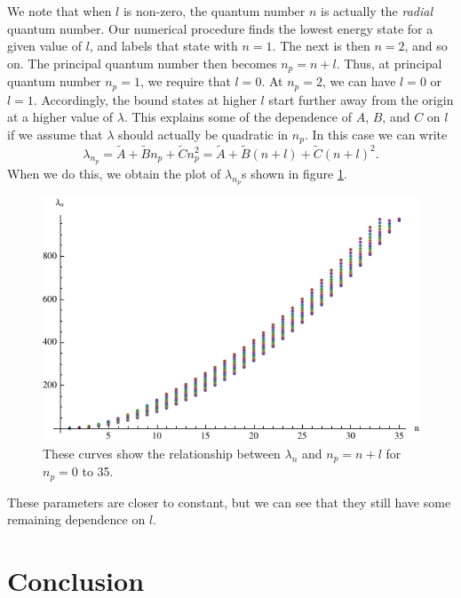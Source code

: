 \documentclass[12pt,twoside]{reedthesis}
\newcommand{\eqn}[1]{\begin{equation}#1\end{equation}}
\begin{document}
We note that when $l$ is non-zero, the quantum number $n$ is actually the \emph{radial} quantum number. Our numerical procedure finds the lowest energy state for a given value of $l$, and labels that state with $n = 1$. The next is then $n = 2$, and so on. The principal quantum number then becomes $n_p = n + l$. Thus, at principal quantum number $n_p = 1$, we require that $l = 0$. At $n_p = 2$, we can have $l = 0$ or $l = 1$. Accordingly, the bound states at higher $l$ start further away from the origin at a higher value of $\lambda$. 
This explains some of the dependence of $A$, $B$, and $C$ on $l$ if we assume that $\lambda$ should actually be quadratic in $n_p$. In this case we can write
\eqn{
\lambda_{n_p} = \tilde{A} + \tilde{B} n_p + \tilde{C} n_p^2 = \tilde{A} + \tilde{B} (n + l) + \tilde{C} (n + l)^2\mbox{.}
}
When we do this, we obtain the plot of $\lambda_{n_p}$s shown in figure \ref{fig:alllcs-principal}.

\begin{figure}[h]
\centering
\includegraphics{Figures/alllcs-principal}
\caption[Plots of $\lambda_n$ versus $n + l$ for $l = 0$ to $10$]{These curves show the relationship between $\lambda_n$ and $n_p = n + l$ for $n_p = 0$ to 35.}
\label{fig:alllcs-principal}
\end{figure}

These parameters are closer to constant, but we can see that they still have some remaining dependence on $l$.


%
%
\chapter*{Conclusion}
	\setcounter{chapter}{4}
	\setcounter{section}{0}
\end{document}
